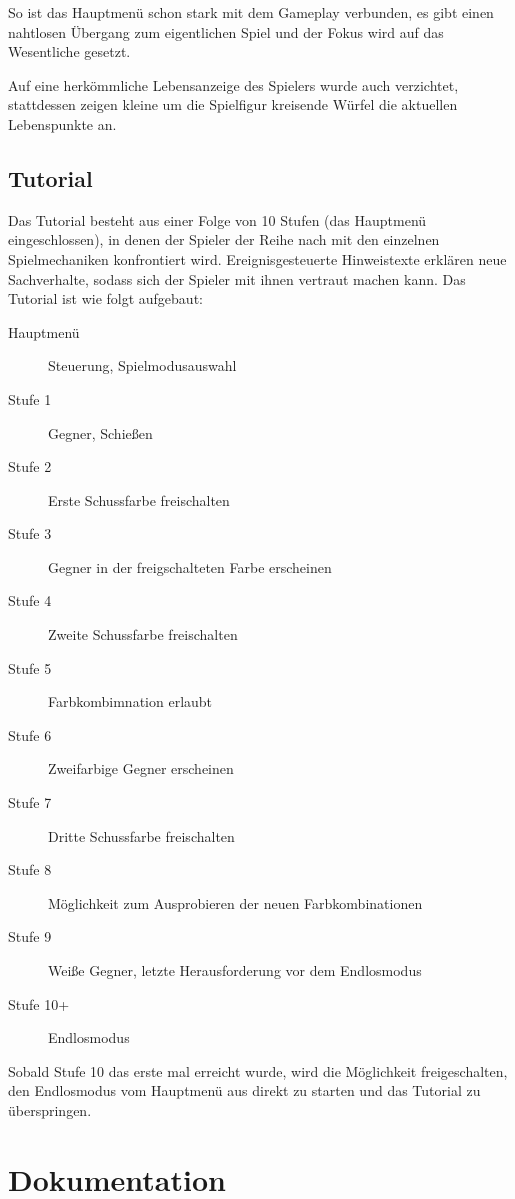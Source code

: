 \documentclass[a4paper,10pt,ngerman,fontsize=12pt]{scrreprt}
\begin{document}
So ist das Hauptmenü schon stark mit dem Gameplay verbunden, es gibt einen nahtlosen Übergang zum eigentlichen Spiel und der Fokus wird auf das Wesentliche gesetzt.

Auf eine herkömmliche Lebensanzeige des Spielers wurde auch verzichtet, stattdessen zeigen kleine um die Spielfigur kreisende Würfel die aktuellen Lebenspunkte an.



\section{Tutorial}

Das Tutorial besteht aus einer Folge von 10 Stufen (das Hauptmenü eingeschlossen), in denen der Spieler der Reihe nach mit den einzelnen Spielmechaniken konfrontiert wird. Ereignisgesteuerte Hinweistexte erklären neue Sachverhalte, sodass sich der Spieler mit ihnen vertraut machen kann. Das Tutorial ist wie folgt aufgebaut:

\begin{description}
\item[Hauptmenü] Steuerung, Spielmodusauswahl
\item[Stufe 1] Gegner, Schie{\ss}en
\item[Stufe 2] Erste Schussfarbe freischalten
\item[Stufe 3] Gegner in der freigschalteten Farbe erscheinen
\item[Stufe 4] Zweite Schussfarbe freischalten
\item[Stufe 5] Farbkombimnation erlaubt
\item[Stufe 6] Zweifarbige Gegner erscheinen
\item[Stufe 7] Dritte Schussfarbe freischalten
\item[Stufe 8] Möglichkeit zum Ausprobieren der neuen Farbkombinationen
\item[Stufe 9] Wei{\ss}e Gegner, letzte Herausforderung vor dem Endlosmodus
\item[Stufe 10+] Endlosmodus
\end{description}

Sobald Stufe 10 das erste mal erreicht wurde, wird die Möglichkeit freigeschalten, den Endlosmodus vom Hauptmenü aus direkt zu starten und das Tutorial zu überspringen.



\chapter{Dokumentation}
\end{document}
